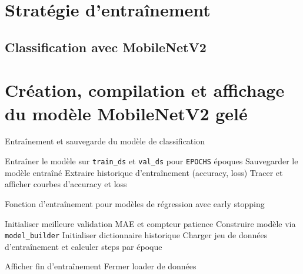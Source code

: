 \section{Stratégie d’entraînement}
\label{sec:entrainement}

\subsection{Classification avec MobileNetV2}
\section*{Création, compilation et affichage du modèle MobileNetV2 gelé}

\begin{algorithm}[H]
\caption{Entraînement et sauvegarde du modèle de classification}

Entraîner le modèle sur \texttt{train\_ds} et \texttt{val\_ds} pour \texttt{EPOCHS} époques\;
Sauvegarder le modèle entraîné\;
Extraire historique d’entraînement (accuracy, loss)\;
Tracer et afficher courbes d’accuracy et loss\;
\end{algorithm}

\vspace{8pt}

\begin{algorithm}[H]
\caption{Fonction d'entraînement pour modèles de régression avec early stopping}

Initialiser meilleure validation MAE et compteur patience\;
Construire modèle via \texttt{model\_builder}\;
Initialiser dictionnaire historique\;
Charger jeu de données d’entraînement et calculer steps par époque\;


Afficher fin d'entraînement\;
Fermer loader de données\;
\end{algorithm}

